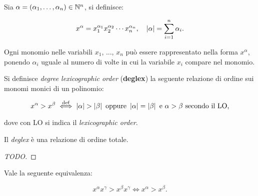 \begin{definition}
    Sia $\alpha = (\alpha_1, \ldots, \alpha_n) \in \mathbb N^n$, si definisce:
    
    \[ x^\alpha = x_1^{\alpha_1} x_2^{\alpha_2} \cdots x_n^{\alpha_n}, \quad
        \left|\alpha\right| = \sum_{i=1}^n \alpha_i. \]
\end{definition}

\begin{remark*}
    Ogni monomio nelle variabili $x_1$, ..., $x_n$ può essere rappresentato
    nella forma $x^\alpha$, ponendo $\alpha_i$ uguale al numero di volte
    in cui la variabile $x_i$ compare nel monomio.
\end{remark*}

\begin{definition}
    Si definisce \textit{degree lexicographic order} (\textbf{deglex}) la seguente
    relazione di ordine sui monomi monici di un polinomio:

    \[ x^\alpha > x^\beta \overset{\mathrm{def}}{\iff} \left|\alpha\right| > \left|\beta\right| \text{ oppure }  \\
        \left|\alpha\right| = \left|\beta\right| \text{ e } \alpha > \beta \text{ secondo il LO,} \]
        
    \vskip 0.1in
    
    dove con LO si indica il \textit{lexicographic order}.
\end{definition}

\begin{proposition}
    Il \textit{deglex} è una relazione di ordine totale.
\end{proposition}

\begin{proof}
    [TODO]
\end{proof}

\begin{proposition}
    \label{prop:moltiplicazione_disuguaglianza_deglex}
    Vale la seguente equivalenza:
    
    \[ x^\alpha x^\gamma > x^\beta x^\gamma \iff x^\alpha > x^\beta. \]
\end{proposition}

